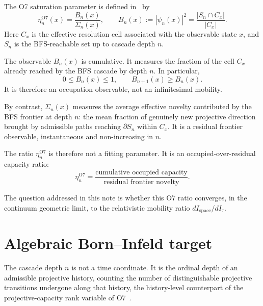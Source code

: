 \documentclass[11pt]{article}
\begin{document}
    The O7 saturation parameter is defined in~\cite{Beau2026a11} by
    \[
      \eta_n^{\mathrm{O7}}(x)
      =
      \frac{B_n(x)}{\Sigma_n(x)},
      \qquad
      B_n(x) := |\psi_n(x)|^2
      =
      \frac{|S_n \cap C_x|}{|C_x|}.
    \]
    Here $C_x$ is the effective resolution cell associated with the observable state $x$,
    and $S_n$ is the BFS-reachable set up to cascade depth $n$.

    The observable $B_n(x)$ is cumulative.
    It measures the fraction of the cell $C_x$ already reached by the BFS cascade by
    depth $n$.
    In particular,
    \[
      0 \leq B_n(x) \leq 1,
      \qquad
      B_{n+1}(x) \geq B_n(x).
    \]
    It is therefore an occupation observable, not an infinitesimal mobility.

    By contrast, $\Sigma_n(x)$ measures the average effective novelty contributed by
    the BFS frontier at depth $n$: the mean fraction of genuinely new projective
    direction brought by admissible paths reaching $\partial S_n$ within $C_x$.
    It is a residual frontier observable, instantaneous and non-increasing in $n$.

    The ratio $\eta_n^{\mathrm{O7}}$ is therefore not a fitting parameter.
    It is an occupied-over-residual capacity ratio:
    \[
      \eta_n^{\mathrm{O7}}
      =
      \frac{\text{cumulative occupied capacity}}{\text{residual frontier novelty}}.
    \]

    The question addressed in this note is whether this O7 ratio converges, in the
    continuum geometric limit, to the relativistic mobility ratio $dI_{\mathrm{space}}/dI_\tau$.

  \section{Algebraic Born--Infeld target}
    \label{sec:bi}

    The cascade depth $n$ is not a time coordinate.
    It is the ordinal depth of an admissible projective history, counting the number of
    distinguishable projective transitions undergone along that history, the history-level
    counterpart of the projective-capacity rank variable of O7~\cite{Beau2026a11}.
\end{document}
